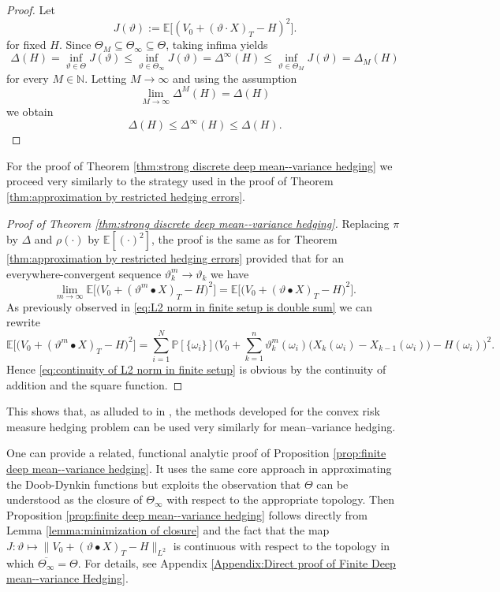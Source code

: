\documentclass[11pt,a4paper,twoside,openany]{report}
\numberwithin{equation}{section}
\theoremstyle{plain} %
\theoremstyle{definition} %
\theoremstyle{remark} %
\let\parencite\authnumparencite
\begin{document}
\begin{proof}
Let
\[
J(\vartheta):=\mathbb{E}\Big[(V_0+(\vartheta\cdot X)_T-H)^2\Big].
\]
for fixed \(H\).
Since \(\Theta_M\subseteq \Theta_\infty\subseteq \Theta\), taking infima yields
\[
\Delta(H)=\inf_{\vartheta\in\Theta}J(\vartheta)
\leq
\inf_{\vartheta\in\Theta_\infty}J(\vartheta)
=
\Delta^\infty(H)
\leq
\inf_{\vartheta\in\Theta_M}J(\vartheta)
=
\Delta_M(H)
\]
for every \(M\in\mathbb N\). Letting \(M\to\infty\) and using the assumption
\[
\lim_{M\to\infty}\Delta^M(H)=\Delta(H)
\]
we obtain
\[
\Delta(H)\leq \Delta^\infty(H)\leq \Delta(H).
\]
\end{proof}
For the proof of Theorem \ref{thm:strong discrete deep mean--variance hedging} we proceed very similarly to the strategy used in the proof of Theorem \ref{thm:approximation by restricted hedging errors}.
\begin{proof}[Proof of Theorem \ref{thm:strong discrete deep mean--variance hedging}]
Replacing \(\pi\) by \(\Delta\) and \(\rho(\cdot)\) by \(\mathbb{E}[(\cdot)^2]\), the proof is the same as for Theorem \ref{thm:approximation by restricted hedging errors} provided that for an everywhere-convergent sequence \(\vartheta_k^m\to\vartheta_k\) we have
\begin{equation}\label{eq:continuity of L2 norm in finite setup}
    \lim_{m\to\infty}\mathbb{E}\Big[\big(V_0+(\vartheta^m\bullet X)_T-H\big)^2\Big]=\mathbb{E}\Big[\big(V_0+(\vartheta\bullet X)_T-H\big)^2\Big].
\end{equation}
As previously observed in \eqref{eq:L2 norm in finite setup is double sum} we can rewrite 
\begin{equation*}
    \mathbb{E}\Big[\big(V_0+(\vartheta^m\bullet X)_T-H\big)^2\Big]=\sum_{i=1}^N\mathbb{P}[\{\omega_i\}]\Big( V_0+\sum_{k=1}^n\vartheta_k^m(\omega_i)\big(X_k(\omega_i)-X_{k-1}(\omega_i)\big)-H(\omega_i)\Big)^2.
\end{equation*}
Hence \eqref{eq:continuity of L2 norm in finite setup} is obvious by the continuity of addition and the square function.
\end{proof}
This shows that, as alluded to in \parencite[Remark~3.4]{Buehler2018DeepHedging}, the methods developed for the convex risk measure hedging problem can be used very similarly for mean--variance hedging.

One can provide a related, functional analytic proof of Proposition \ref{prop:finite deep mean--variance hedging}. It uses the same core approach in approximating the Doob-Dynkin functions but exploits the observation that \(\Theta\) can be understood as the closure of \(\Theta_{\infty}\) with respect to the appropriate topology. Then Proposition \ref{prop:finite deep mean--variance hedging} follows directly from Lemma \ref{lemma:minimization of closure} and the fact that the map \(J:\vartheta\mapsto\lVert V_0+(\vartheta\bullet X)_T-H\rVert_{L^2}\) is continuous with respect to the topology in which \(\overline{\Theta_{\infty}}=\Theta\). For details, see Appendix \ref{Appendix:Direct proof of Finite Deep mean--variance Hedging}.
\end{document}
